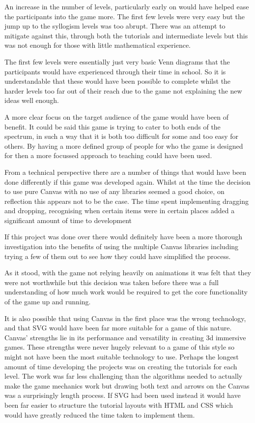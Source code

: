 \documentclass[12pt,a4paper]{report}
\begin{document}
An increase in the number of levels, particularly early on would have helped ease the participants into the game more. The first few levels were very easy but the jump up to the syllogism levels was too abrupt. There was an attempt to mitigate against this, through both the tutorials and intermediate levels but this was not enough for those with little mathematical experience. 

The first few levels were essentially just very basic Venn diagrams that the participants would have experienced through their time in school. So it is understandable that these would have been possible to complete whilst the harder levels too far out of their reach due to the game not explaining the new ideas well enough.

A more clear focus on the target audience of the game would have been of benefit. It could be said this game is trying to cater to both ends of the spectrum, in such a way that it is both too difficult for some and too easy for others. By having a more defined group of people for who the game is designed for then a more focussed approach to teaching could have been used.

From a technical perspective there are a number of things that would have been done differently if this game was developed again. Whilst at the time the decision to use pure Canvas with no use of any libraries seemed a good choice, on reflection this appears not to be the case. The time spent implementing dragging and dropping, recognising when certain items were in certain places added a significant amount of time to development

If this project was done over there would definitely have been a more thorough investigation into the benefits of using the multiple Canvas libraries including trying a few of them out to see how they could have simplified the process. 

As it stood, with the game not relying heavily on animations it was felt that they were not worthwhile but this decision was taken before there was a full understanding of how much work would be required to get the core functionality of the game up and running. 

It is also possible that using Canvas in the first place was the wrong technology, and that SVG would have been far more suitable for a game of this nature. Canvas' strengths lie in its performance and versatility in creating 3d immersive games. These strengths were never hugely relevant to a game of this style so might not have been the most suitable technology to use. Perhaps the longest amount of time developing the projects was on creating the tutorials for each level. The work was far less challenging than the algorithms needed to actually make the game mechanics work but drawing both text and arrows on the Canvas was a surprisingly length process. If SVG had been used instead it would have been far easier to structure the tutorial layouts with HTML and CSS which would have greatly reduced the time taken to implement them.
\end{document}

